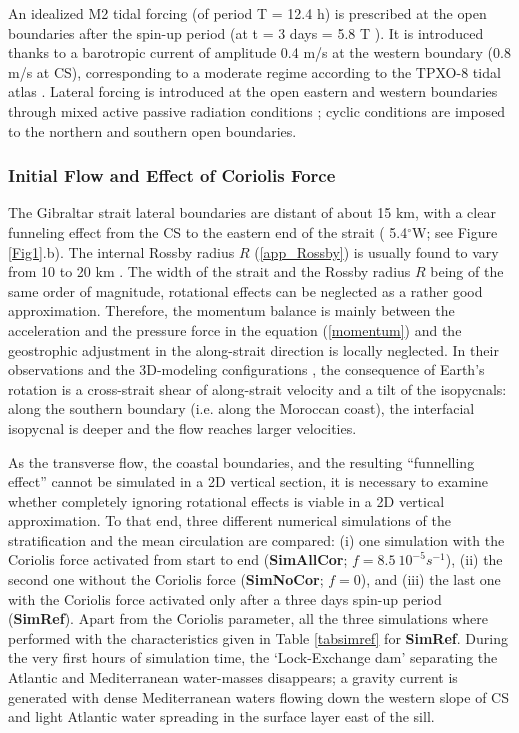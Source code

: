 An idealized M2 tidal forcing (of period T = 12.4 h) is prescribed at the open boundaries after the spin-up period (at t = 3 days = 5.8 T ). It is introduced thanks to a barotropic current of amplitude 0.4 m/s at the western boundary (0.8 m/s at CS), corresponding to a moderate regime according to the TPXO-8 tidal atlas \citep{tpxo8}. Lateral forcing is introduced at the open eastern and western boundaries through mixed active passive radiation conditions  \citep{Marchesiello2001} ; cyclic conditions are imposed to the northern and southern open boundaries.

\subsubsection{Initial Flow and Effect of Coriolis Force}
\label{Coriolis}

The Gibraltar strait lateral boundaries  are distant of about 15 km, with a clear funneling effect from the CS to the eastern end of the strait ( 5.4$^\circ$W; see Figure \ref{Fig1}.b). The internal Rossby radius $R$ (\ref{app_Rossby}) is usually found to vary from 10 to 20 km \citep{Bormans1989, CW90, vlasenko_2009}. The width of the strait and the Rossby radius $R$ being of the same order of magnitude, rotational effects can be neglected as a rather good approximation. Therefore, the momentum balance is mainly between the acceleration and the pressure force in the equation (\ref{momentum}) and the geostrophic adjustment in the along-strait direction is locally neglected. In their observations \citep{FA1988} and the 3D-modeling configurations \citep{Sannino2002}, the consequence of Earth's rotation is a cross-strait shear of along-strait velocity \citep{Bormans1989} and a tilt of the isopycnals: along the southern boundary  (i.e. along the Moroccan coast), the interfacial isopycnal is deeper and the flow reaches larger velocities.

As the transverse flow, the coastal boundaries, and the resulting ``funnelling effect'' cannot be simulated in a 2D vertical section, it is necessary to examine whether completely ignoring rotational effects is viable in a 2D vertical approximation. To that end, three different numerical simulations of the stratification and the mean circulation are compared: (i) one simulation with the Coriolis force activated from start to end (\textbf{SimAllCor}; $f = 8.5 \ 10^{-5} s^{-1}$), (ii) the second one without the Coriolis force (\textbf{SimNoCor}; $f=0$), and (iii) the last one with the Coriolis force activated only after a three days spin-up period (\textbf{SimRef}). Apart from the Coriolis parameter, all the three simulations where performed with the characteristics given in Table \ref{tabsimref} for \textbf{SimRef}. During the very first hours of simulation time, the `Lock-Exchange dam' separating the Atlantic and Mediterranean water-masses disappears; a gravity current is generated with dense Mediterranean waters flowing down the western slope of CS and light Atlantic water spreading in the surface layer east of the sill.

